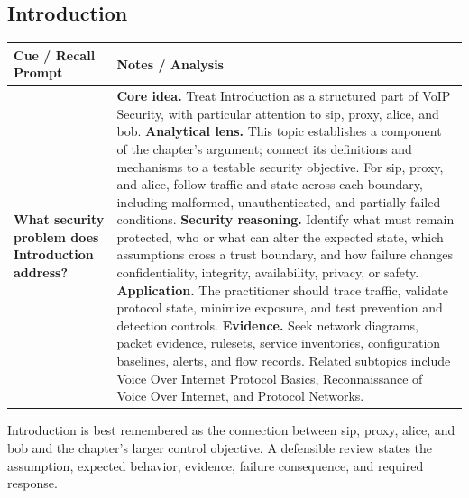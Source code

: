 \documentclass[11pt]{article}
\newcommand{\CornellHeader}{%
\rowcolor{Navy}\color{white}\bfseries Cue / Recall Prompt & \color{white}\bfseries Notes / Analysis\\\hline}
\newcommand{\CornellRow}[2]{%
\cellcolor{CueGray}\RaggedRight\textbf{#1} & \RaggedRight #2\\\hline}
\begin{document}
\subsection*{Introduction}
\begin{longtable}{>{\RaggedRight\arraybackslash}p{}|>{\RaggedRight\arraybackslash}p{}}
\CornellHeader
\CornellRow{What security problem does Introduction address?}{\textbf{Core idea.} Treat Introduction as a structured part of VoIP Security, with particular attention to sip, proxy, alice, and bob. \textbf{Analytical lens.} This topic establishes a component of the chapter's argument; connect its definitions and mechanisms to a testable security objective. For sip, proxy, and alice, follow traffic and state across each boundary, including malformed, unauthenticated, and partially failed conditions. \textbf{Security reasoning.} Identify what must remain protected, who or what can alter the expected state, which assumptions cross a trust boundary, and how failure changes confidentiality, integrity, availability, privacy, or safety. \textbf{Application.} The practitioner should trace traffic, validate protocol state, minimize exposure, and test prevention and detection controls. \textbf{Evidence.} Seek network diagrams, packet evidence, rulesets, service inventories, configuration baselines, alerts, and flow records. Related subtopics include Voice Over Internet Protocol Basics, Reconnaissance of Voice Over Internet, and Protocol Networks.}
\end{longtable}
\begin{topicsummary}
Introduction is best remembered as the connection between sip, proxy, alice, and bob and the chapter's larger control objective. A defensible review states the assumption, expected behavior, evidence, failure consequence, and required response.
\end{topicsummary}
\end{document}
